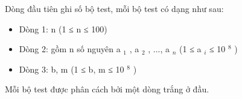 Dòng đầu tiên ghi số bộ test, mỗi bộ test có dạng như sau:
\begin{itemize}
	\item Dòng 1: n (1 ≤ n ≤ 100)
	\item Dòng 2: gồm n số nguyên a $_ 1 $ , a $_ 2 $ , ..., a $_ n $ (1 ≤ a $_ i $ ≤ 10 $^ 8 $ )
	\item Dòng 3: b, m (1 ≤ b, m ≤ 10 $^ 8 $ )
\end{itemize}

Mỗi bộ test được phân cách bởi một dòng trắng ở đầu.
